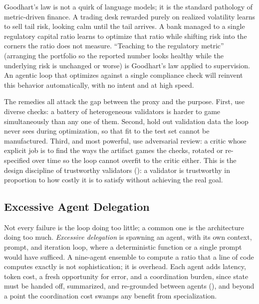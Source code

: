 \begin{context}
Goodhart's law is not a quirk of language models; it is the standard pathology of
metric-driven finance. A trading desk rewarded purely on realized volatility
learns to sell tail risk, looking calm until the tail arrives. A bank managed to
a single regulatory capital ratio learns to optimize that ratio while shifting
risk into the corners the ratio does not measure. ``Teaching to the regulatory
metric'' (arranging the portfolio so the reported number looks healthy while
the underlying risk is unchanged or worse) is Goodhart's law applied to
supervision. An agentic loop that optimizes against a single compliance check
will reinvent this behavior automatically, with no intent and at high speed.
\end{context}

The remedies all attack the gap between the proxy and the purpose. First, use
diverse checks: a battery of heterogeneous validators is harder to game
simultaneously than any one of them. Second, hold out validation data the loop
never sees during optimization, so that fit to the test set cannot be
manufactured. Third, and most powerful, use adversarial review: a critic whose
explicit job is to find the ways the artifact games the checks, rotated or
re-specified over time so the loop cannot overfit to the critic either. This is
the design discipline of trustworthy validators ():
a validator is trustworthy in proportion to how costly it is to satisfy
without achieving the real goal.

\subsection{Excessive Agent Delegation}\label{subsec:excessive-delegation}

Not every failure is the loop doing too little; a common one is the architecture
doing too much. \emph{Excessive delegation} is spawning an agent, with its own
context, prompt, and iteration loop, where a deterministic function or a single
prompt would have sufficed. A nine-agent ensemble to compute a ratio that a line
of code computes exactly is not sophistication; it is overhead. Each agent adds
latency, token cost, a fresh opportunity for error, and a coordination burden,
since state must be handed off, summarized, and re-grounded between agents
(), and beyond a point the coordination cost
swamps any benefit from specialization.


